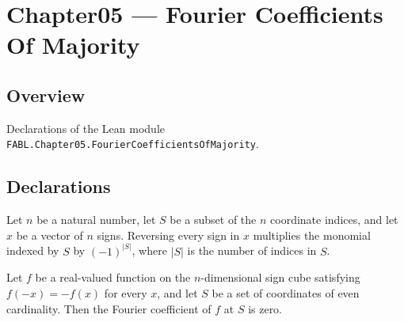 \chapter{Chapter05 — Fourier Coefficients Of Majority}
\section{Overview}

Declarations of the Lean module \texttt{FABL.Chapter05.FourierCoefficientsOfMajority}.

\section{Declarations}

\begin{theorem}
\label{FABL.monomial_neg_input}
\leanok
{}
Let $n$ be a natural number, let $S$ be a subset of the $n$ coordinate indices, and let
$x$ be a vector of $n$ signs. Reversing every sign in $x$ multiplies the monomial
indexed by $S$ by $(-1)^{|S|}$, where $|S|$ is the number of indices in $S$.
\end{theorem}

\begin{theorem}
\label{FABL.fourierCoeff_eq_zero_of_odd_of_even_card}
\leanok
{}
Let $f$ be a real-valued function on the $n$-dimensional sign cube satisfying
$f(-x)=-f(x)$ for every $x$, and let $S$ be a set of coordinates of even cardinality.
Then the Fourier coefficient of $f$ at $S$ is zero.
\end{theorem}

